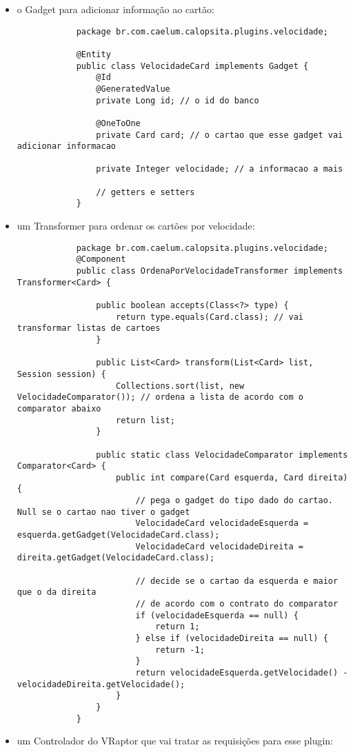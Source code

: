 \begin{itemize}
	\item{o Gadget para adicionar informação ao cartão:
		\begin{lstlisting}
			package br.com.caelum.calopsita.plugins.velocidade;
			
			@Entity
			public class VelocidadeCard implements Gadget {
				@Id
				@GeneratedValue
				private Long id; // o id do banco
				
				@OneToOne
				private Card card; // o cartao que esse gadget vai adicionar informacao
				
				private Integer velocidade; // a informacao a mais
				
				// getters e setters
			}
		\end{lstlisting}	
	}
	\item{um Transformer para ordenar os cartões por velocidade:
		\begin{lstlisting}
			package br.com.caelum.calopsita.plugins.velocidade;
			@Component
			public class OrdenaPorVelocidadeTransformer implements Transformer<Card> {

				public boolean accepts(Class<?> type) {
					return type.equals(Card.class); // vai transformar listas de cartoes
				}

				public List<Card> transform(List<Card> list, Session session) {
					Collections.sort(list, new VelocidadeComparator()); // ordena a lista de acordo com o comparator abaixo
					return list;
				}

				public static class VelocidadeComparator implements Comparator<Card> {
					public int compare(Card esquerda, Card direita) {
						// pega o gadget do tipo dado do cartao. Null se o cartao nao tiver o gadget
						VelocidadeCard velocidadeEsquerda = esquerda.getGadget(VelocidadeCard.class); 
						VelocidadeCard velocidadeDireita = direita.getGadget(VelocidadeCard.class);
						
						// decide se o cartao da esquerda e maior que o da direita
						// de acordo com o contrato do comparator
						if (velocidadeEsquerda == null) {
							return 1;
						} else if (velocidadeDireita == null) {
							return -1;
						}
						return velocidadeEsquerda.getVelocidade() - velocidadeDireita.getVelocidade();
					}
				}
			}

		\end{lstlisting}
	}
	
	\item{um Controlador do VRaptor que vai tratar as requisições para esse plugin:
	
}
\end{itemize}
